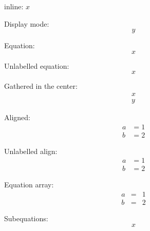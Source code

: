 \documentclass{article}
\begin{document}
    inline: $x$

    Display mode:
    \[ y \]

    Equation:
    \begin{equation}
        x
    \end{equation}

    Unlabelled equation:
    \begin{equation*}
        x
    \end{equation*}

    Gathered in the center:
    \begin{gather}
        x \\
        y
    \end{gather}

    Aligned:
    \begin{align}
        a &= 1 \\
        b &= 2
    \end{align}

    Unlabelled align:
    \begin{align*}
        a &= 1 \\
        b &= 2
    \end{align*}

    Equation array:
    \begin{eqnarray}
        a &=& 1 \\
        b &=& 2
    \end{eqnarray}

    Subequations:
    \begin{subequations}
        \begin{equation} x \end{equation}
    \end{subequations}
\end{document}
